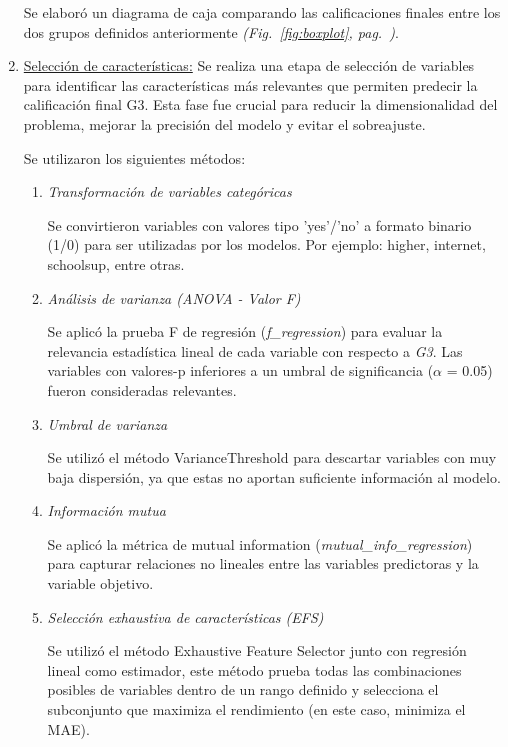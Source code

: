 \documentclass{article}
\begin{document}
\begin{enumerate}
    Se elaboró un diagrama de caja comparando las calificaciones finales entre los dos grupos definidos anteriormente {\textit{(Fig.~\ref{fig:boxplot}, pag.~\pageref{fig:boxplot})}}.
    
    \item \underline{Selección de características:} Se realiza una etapa de selección de variables para identificar las características más relevantes que permiten predecir la calificación final G3. Esta fase fue crucial para reducir la dimensionalidad del problema, mejorar la precisión del modelo y evitar el sobreajuste.
    
    
    Se utilizaron los siguientes métodos:
    \begin{enumerate}[label=\roman*.]
    \item {\textit{Transformación de variables categóricas}} 
    
    
    Se convirtieron variables con valores tipo 'yes'/'no' a formato binario (1/0) para ser utilizadas por los modelos. Por ejemplo: higher, internet, schoolsup, entre otras.
    \item {\textit{Análisis de varianza (ANOVA - Valor F)}} 
    
    
    Se aplicó la prueba F de regresión (\textit{f\_regression}) para evaluar la relevancia estadística lineal de cada variable con respecto a \textit{G3}. Las variables con valores-p inferiores a un umbral de significancia ($\alpha$ = 0.05) fueron consideradas relevantes.
    \item {\textit{Umbral de varianza}} 
    
    
    Se utilizó el método VarianceThreshold para descartar variables con muy baja dispersión, ya que estas no aportan suficiente información al modelo.
    \item {\textit{Información mutua}} 
    
    
    Se aplicó la métrica de mutual information (\textit{mutual\_info\_regression}) para capturar relaciones no lineales entre las variables predictoras y la variable objetivo.
    \item {\textit{Selección exhaustiva de características (EFS)}} 
    
    
    Se utilizó el método Exhaustive Feature Selector junto con regresión lineal como estimador, este método prueba todas las combinaciones posibles de variables dentro de un rango definido y selecciona el subconjunto que maximiza el rendimiento (en este caso, minimiza el MAE).
    \end{enumerate}
    

\end{enumerate}
\end{document}
